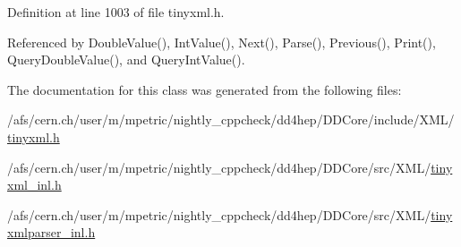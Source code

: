 Definition at line 1003 of file tinyxml.h.

Referenced by DoubleValue(), IntValue(), Next(), Parse(), Previous(), Print(), QueryDoubleValue(), and QueryIntValue().

The documentation for this class was generated from the following files:\begin{DoxyCompactItemize}
\item 
/afs/cern.ch/user/m/mpetric/nightly\_\-cppcheck/dd4hep/DDCore/include/XML/\hyperlink{tinyxml_8h}{tinyxml.h}\item 
/afs/cern.ch/user/m/mpetric/nightly\_\-cppcheck/dd4hep/DDCore/src/XML/\hyperlink{tinyxml__inl_8h}{tinyxml\_\-inl.h}\item 
/afs/cern.ch/user/m/mpetric/nightly\_\-cppcheck/dd4hep/DDCore/src/XML/\hyperlink{tinyxmlparser__inl_8h}{tinyxmlparser\_\-inl.h}\end{DoxyCompactItemize}
